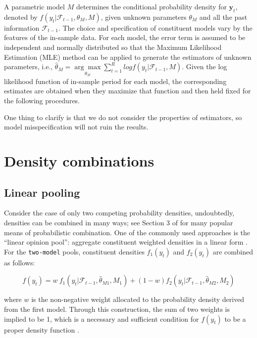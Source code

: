 \documentclass{monashthesis}
\begin{document}
A parametric model \(M\) determines the conditional probability density for \(\textbf{y}_t\), denoted by \(f(y_t|\mathcal{F}_{t-1}, \theta_M, M)\), given unknown parameters \(\theta_M\) and all the past information \(\mathcal{F}_{t-1}\). The choice and specification of constituent models vary by the features of the in-sample data. For each model, the error term is assumed to be independent and normally distributed so that the Maximum Likelihood Estimation (MLE) method can be applied to generate the estimators of unknown parameters, i.e., \(\hat\theta_M = \underset{\theta_M}{\arg\max} \sum^R_{t=1} log f(y_t|\mathcal{F}_{t-1}, M)\). Given the log likelihood function of in-sample period for each model, the corresponding estimates are obtained when they maximize that function and then held fixed for the following procedures.

One thing to clarify is that we do not consider the properties of estimators, so model misspecification will not ruin the results.

\hypertarget{density-combinations}{%
\section{Density combinations}\label{density-combinations}}

\hypertarget{linear-pooling}{%
\subsection{Linear pooling}\label{linear-pooling}}

Consider the case of only two competing probability densities, undoubtedly, densities can be combined in many ways; see Section 3 of \textcite{WHLK22} for many popular means of probabilistic combination. One of the commonly used approaches is the ``linear opinion pool'': aggregate constituent weighted densities in a linear form \autocite{BG69,HM07,GA11}. For the \texttt{two-model} pools, constituent densities \(f_1(y_t)\) and \(f_2(y_t)\) are combined as follows:

\begin{equation}
\label{eqn:LC1}
f(y_t) = w \ f_1(y_t | \mathcal{F}_{t-1}, \hat\theta_{M1}, M_1) + (1-w) f_2(y_t | \mathcal{F}_{t-1}, \hat\theta_{M2}, M_2)
\end{equation}

where \(w\) is the non-negative weight allocated to the probability density derived from the first model. Through this construction, the sum of two weights is implied to be 1, which is a necessary and sufficient condition for \(f(y_t)\) to be a proper density function \autocite{GA11}.
\end{document}
